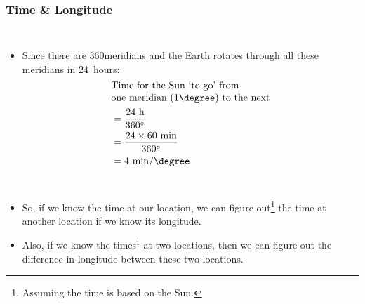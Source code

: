 \begin{frame}
\frametitle{Time \& Longitude}
\def\fn{\tiny Assuming the time is based on the Sun.}
\begin{columns}[t]
	\begin{itemize} 
		\item Since there are 360\degree meridians and the Earth rotates through all these meridians in 24~hours:
		{
			\color{black!90}
			\small\begin{align*}
			&\text{\shortstack[l]{Time for the Sun `to go' from\\ one meridian (1\degree) to the next}} \\
			&= \frac{24\text{ h}}{360 ^\circ} \\ 
			&= \frac{24\times 60 \text{ min}}{360^\circ} \\
			&= 4\text{ min/\degree}
			\end{align*}
		}
	\end{itemize}
\end{columns}

\begin{itemize}
	\item So, if we know the time at our location, we can figure out\footnote{\fn} the time at another location if we know its longitude.
	\item Also, if we know the times$^\text{1}$ at two locations, then we can figure out the difference in longitude between these two locations.
\end{itemize}
\end{frame}

